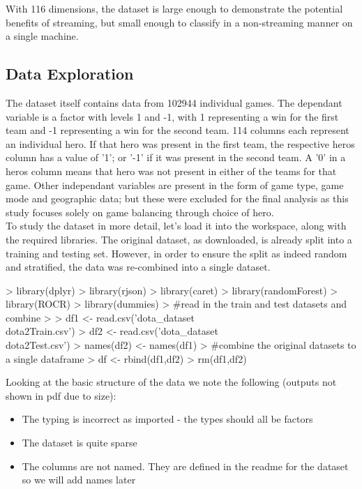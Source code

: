 \documentclass[10pt]{article}
\begin{document}
With 116 dimensions, the dataset is large enough to demonstrate the potential benefits of streaming, but small enough to classify in a non-streaming manner on a single machine. 

\subsection{Data Exploration}

The dataset itself contains data from 102944 individual games. The dependant variable is a factor with levels 1 and -1, with 1 representing a win for the first team and -1 representing a win for the second team. 114 columns each represent an individual hero. If that hero was present in the first team, the respective heros column has a value of '1'; or '-1' if it was present in the second team. A '0' in a heros column means that hero was not present in either of the teams for that game.
Other independant variables are present in the form of game type, game mode and geographic data; but these were excluded for the final analysis as this study focuses solely on game balancing through choice of hero.\\

To study the dataset in more detail, let's load it into the workspace, along with the required libraries. The original dataset, as downloaded, is already split into a training and testing set. However, in order to ensure the split as indeed random and stratified, the data was re-combined into a single dataset.

\begin{Schunk}
\begin{Sinput}
> library(dplyr)
> library(rjson)
> library(caret)
> library(randomForest)
> library(ROCR)
> library(dummies)
> #read in the train and test datasets and combine 
> 
> df1 <- read.csv('dota_dataset\\dota2Train.csv')
> df2 <- read.csv('dota_dataset\\dota2Test.csv')
> names(df2) <- names(df1)
> #combine the original datasets to a single dataframe
> df <- rbind(df1,df2)
> rm(df1,df2)
\end{Sinput}
\end{Schunk}

Looking at the basic structure of the data we note the following (outputs not shown in pdf due to size):
 
\begin{itemize}
  \item The typing is incorrect as imported - the types should all be factors
  \item The dataset is quite sparse
  \item The columns are not named. They are defined in the readme for the dataset so we will add names later
\end{itemize}
\end{document}
